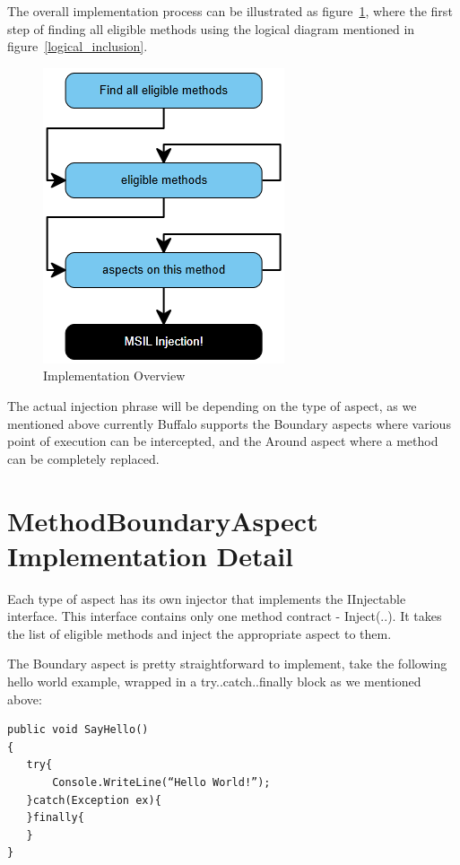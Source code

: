 The overall implementation process can be illustrated as figure~\ref{implementation_overview}, where the first step of finding all eligible methods using the logical diagram mentioned in figure~\ref{logical_inclusion}.

\begin{figure}[H]
  \includegraphics[scale=1.0]{ImplementationOverview3.PNG}
  \centering
  \caption{Implementation Overview\label{implementation_overview}}
\end{figure}

The actual injection phrase will be depending on the type of aspect, as we mentioned above currently Buffalo supports the Boundary aspects where various point of execution can be intercepted, and the Around aspect where a method can be completely replaced.

\section{MethodBoundaryAspect Implementation Detail}

Each type of aspect has its own injector that implements the IInjectable interface. This interface contains only one method contract - Inject(..). It takes the list of eligible methods and inject the appropriate aspect to them.

The Boundary aspect is pretty straightforward to implement, take the following hello world example, wrapped in a try..catch..finally block as we mentioned above:

\begin{lstlisting}[caption={SayHello function}, label=sayhello]
public void SayHello()
{
   try{
       Console.WriteLine(“Hello World!”);
   }catch(Exception ex){
   }finally{
   }
}
\end{lstlisting}

